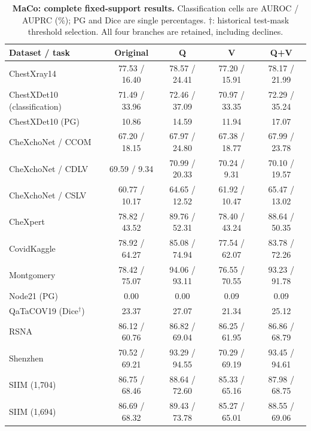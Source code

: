 \begin{table}[tp]
\centering
\caption{\textbf{MaCo: complete fixed-support results.} Classification cells are AUROC / AUPRC (\%); PG and Dice are single percentages. $\dagger$: historical test-mask threshold selection. All four branches are retained, including declines.}
\label{tab:supp-fixed-maco}
\small
\setlength{\tabcolsep}{4pt}
\begin{tabular*}{\textwidth}{@{\extracolsep{\fill}}lcccc@{}}
\toprule
Dataset / task & Original & Q & V & Q+V \\
\midrule
ChestXray14 & 77.53 / 16.40 & 78.57 / 24.41 & 77.20 / 15.91 & 78.17 / 21.99 \\
ChestXDet10 (classification) & 71.49 / 33.96 & 72.46 / 37.09 & 70.97 / 33.35 & 72.29 / 35.24 \\
ChestXDet10 (PG) & 10.86 & 14.59 & 11.94 & 17.07 \\
CheXchoNet / CCOM & 67.20 / 18.15 & 67.97 / 24.80 & 67.38 / 18.77 & 67.99 / 23.78 \\
CheXchoNet / CDLV & 69.59 / 9.34 & 70.99 / 20.33 & 70.24 / 9.31 & 70.10 / 19.57 \\
CheXchoNet / CSLV & 60.77 / 10.17 & 64.65 / 12.52 & 61.92 / 10.47 & 65.47 / 13.02 \\
CheXpert & 78.82 / 43.52 & 89.76 / 52.31 & 78.40 / 43.24 & 88.64 / 50.35 \\
CovidKaggle & 78.92 / 64.27 & 85.08 / 74.94 & 77.54 / 62.07 & 83.78 / 72.26 \\
Montgomery & 78.42 / 75.07 & 94.06 / 93.11 & 76.55 / 70.55 & 93.23 / 91.78 \\
Node21 (PG) & 0.00 & 0.00 & 0.09 & 0.09 \\
QaTaCOV19 (Dice$^\dagger$) & 23.37 & 27.07 & 21.34 & 25.12 \\
RSNA & 86.12 / 60.76 & 86.82 / 69.04 & 86.25 / 61.95 & 86.86 / 68.79 \\
Shenzhen & 70.52 / 69.21 & 93.29 / 94.55 & 70.29 / 69.19 & 93.45 / 94.61 \\
SIIM (1,704) & 86.75 / 68.46 & 88.64 / 72.60 & 85.33 / 65.16 & 87.98 / 68.75 \\
SIIM (1,694) & 86.69 / 68.32 & 89.43 / 73.78 & 85.27 / 65.01 & 88.55 / 69.06 \\
\bottomrule
\end{tabular*}
\end{table}

